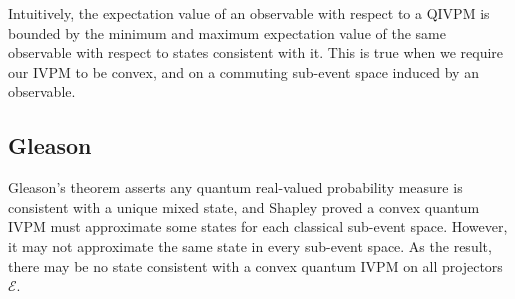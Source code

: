 \documentclass[english,reprint, aps, prl,superscriptaddress, showpacs,
showkeys, longbibliography, amsmath, amssymb]{revtex4-1}
\theoremstyle{plain}
\theoremstyle{definition}
\newcommand{\events}{\ensuremath{\mathcal{E}}}
\begin{document}
Intuitively, the expectation value of an observable with respect to a
QIVPM is bounded by the minimum and maximum expectation value of the
same observable with respect to states consistent with it. This is
true when we require our IVPM to be convex, and on a commuting
sub-event space induced by an observable.

\subsection{Gleason}

Gleason's theorem asserts any quantum real-valued probability measure
is consistent with a unique mixed state, and Shapley proved a convex
quantum IVPM must approximate some states for each classical sub-event
space. However, it may not approximate the same state in every sub-event
space. As the result, there may be no state consistent with a convex
quantum IVPM on all projectors~$\events$.
\end{document}
